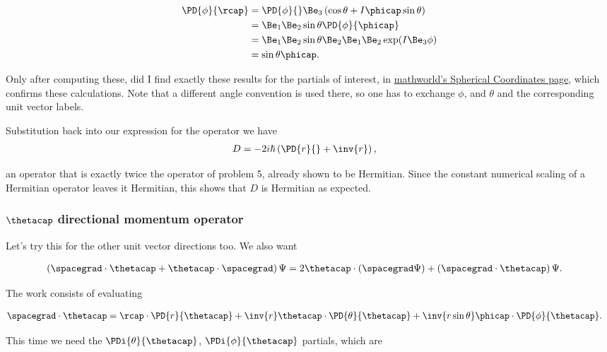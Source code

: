 \begin{align*}
\PD{\phi}{\rcap} 
&= \PD{\phi}{} \Be_3 \left( \cos\theta + I \phicap \sin\theta \right) \\
&= \Be_1 \Be_2 \sin\theta \PD{\phi}{\phicap} \\
&= \Be_1 \Be_2 \sin\theta \Be_2 \Be_1 \Be_2 \exp( I \Be_3 \phi ) \\
&= \sin\theta \phicap.
\end{align*}

Only after computing these, did I find exactly these results for the partials of interest, in \href{http://mathworld.wolfram.com/SphericalCoordinates.html}{mathworld's Spherical Coordinates page}, which confirms these calculations.  Note that a different angle convention is used there, so one has to exchange $\phi$, and $\theta$ and the corresponding unit vector labels.

Substitution back into our expression for the operator we have
\begin{align*}
D &= - 2 i \hbar \left( \PD{r}{} + \inv{r} \right),
\end{align*}

an operator that is exactly twice the operator of problem 5, already shown to be Hermitian.  Since the constant numerical scaling of a Hermitian operator leaves it Hermitian, this shows that $D$ is Hermitian as expected.

\subsubsection{$\thetacap$ directional momentum operator}

Let's try this for the other unit vector directions too.  We also want

\begin{align*}
\left( \spacegrad \cdot \thetacap + \thetacap \cdot \spacegrad \right) \Psi
&=
2 \thetacap \cdot (\spacegrad \Psi) + \left( \spacegrad \cdot \thetacap \right) \Psi.
\end{align*}

The work consists of evaluating

\begin{align*}
\spacegrad \cdot \thetacap 
&= \rcap \cdot \PD{r}{\thetacap}
+ \inv{r} \thetacap \cdot \PD{\theta}{\thetacap}
+ \inv{r \sin\theta} \phicap \cdot \PD{\phi}{\thetacap}.
\end{align*}

This time we need the $\PDi{\theta}{\thetacap}$, $\PDi{\phi}{\thetacap}$ partials, which are

